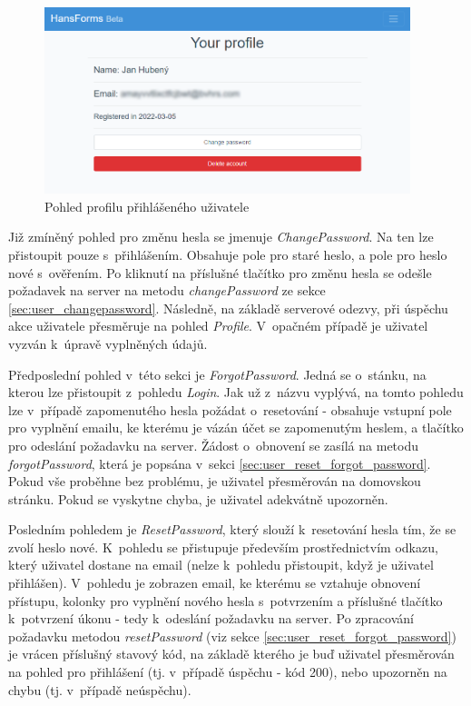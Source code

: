		\begin{figure}[h]
			\centering
			\includegraphics[width=0.95\textwidth]{img/pohledy/profile.png}
			\caption{Pohled profilu přihlášeného uživatele}
			\label{fig:pohled_profile}
		\end{figure}
		
		Již zmíněný pohled pro změnu hesla se jmenuje \textit{ChangePassword}. Na ten lze přistoupit pouze s~přihlášením. Obsahuje pole pro staré heslo, a pole pro heslo nové s~ověřením. Po kliknutí na příslušné tlačítko pro změnu hesla se odešle požadavek na server na metodu \textit{changePassword} ze sekce \ref{sec:user_changepassword}. Následně, na základě serverové odezvy, při úspěchu akce uživatele přesměruje na pohled \textit{Profile}. V~opačném případě je uživatel vyzván k~úpravě vyplněných údajů.
		
		Předposlední pohled v~této sekci je \textit{ForgotPassword}. Jedná se o~stánku, na kterou lze přistoupit z~pohledu \textit{Login}. Jak už z~názvu vyplývá, na tomto pohledu lze v~případě zapomenutého hesla požádat o~resetování - obsahuje vstupní pole pro vyplnění emailu, ke kterému je vázán účet se zapomenutým heslem, a tlačítko pro odeslání požadavku na server. Žádost o~obnovení se zasílá na metodu \textit{forgotPassword}, která je popsána v~sekci \ref{sec:user_reset_forgot_password}. Pokud vše proběhne bez problému, je uživatel přesměrován na domovskou stránku. Pokud se vyskytne chyba, je uživatel adekvátně upozorněn.
		
		Posledním pohledem je \textit{ResetPassword}, který slouží k~resetování hesla tím, že se zvolí heslo nové. K~pohledu se přistupuje především prostřednictvím odkazu, který uživatel dostane na email (nelze k~pohledu přistoupit, když je uživatel přihlášen). V~pohledu je zobrazen email, ke kterému se vztahuje obnovení přístupu, kolonky pro vyplnění nového hesla s~potvrzením a příslušné tlačítko k~potvrzení úkonu - tedy k~odeslání požadavku na server. Po zpracování požadavku metodou \textit{resetPassword} (viz sekce \ref{sec:user_reset_forgot_password}) je vrácen příslušný stavový kód, na základě kterého je buď uživatel přesměrován na pohled pro přihlášení (tj. v~případě úspěchu - kód 200), nebo upozorněn na chybu (tj. v~případě neúspěchu).
		

